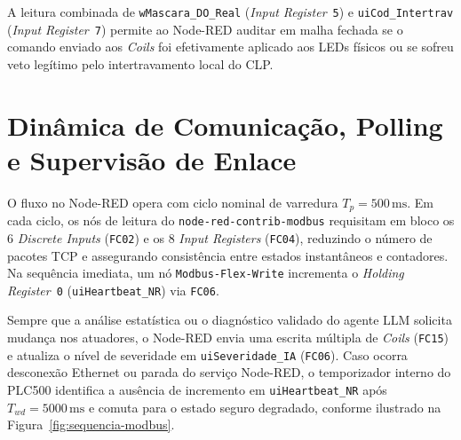 A leitura combinada de \texttt{wMascara\_DO\_Real} (\textit{Input Register}~\texttt{5}) e \texttt{uiCod\_Intertrav} (\textit{Input Register}~\texttt{7}) permite ao Node-RED auditar em malha fechada se o comando enviado aos \textit{Coils} foi efetivamente aplicado aos LEDs físicos ou se sofreu veto legítimo pelo intertravamento local do CLP.

\section{Dinâmica de Comunicação, Polling e Supervisão de Enlace}
\label{sec:arq_sequencia}

O fluxo no Node-RED opera com ciclo nominal de varredura $T_p = 500\,\text{ms}$. Em cada ciclo, os nós de leitura do \texttt{node-red-contrib-modbus} requisitam em bloco os 6 \textit{Discrete Inputs} (\texttt{FC02}) e os 8 \textit{Input Registers} (\texttt{FC04}), reduzindo o número de pacotes TCP e assegurando consistência entre estados instantâneos e contadores. Na sequência imediata, um nó \texttt{Modbus-Flex-Write} incrementa o \textit{Holding Register}~\texttt{0} (\texttt{uiHeartbeat\_NR}) via \texttt{FC06}.

Sempre que a análise estatística ou o diagnóstico validado do agente LLM solicita mudança nos atuadores, o Node-RED envia uma escrita múltipla de \textit{Coils} (\texttt{FC15}) e atualiza o nível de severidade em \texttt{uiSeveridade\_IA} (\texttt{FC06}). Caso ocorra desconexão Ethernet ou parada do serviço Node-RED, o temporizador interno do PLC500 identifica a ausência de incremento em \texttt{uiHeartbeat\_NR} após $T_{wd} = 5000\,\text{ms}$ e comuta para o estado seguro degradado, conforme ilustrado na Figura~\ref{fig:sequencia-modbus}.

